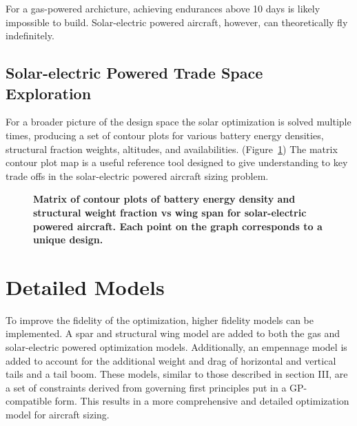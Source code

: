 \documentclass[]{aiaa-tc}%
\begin{document}
For a gas-powered archicture, achieving endurances above 10 days is likely impossible to build.  Solar-electric powered aircraft, however, can theoretically fly indefinitely. 

\subsection{Solar-electric Powered Trade Space Exploration}

For a broader picture of the design space the solar optimization is solved multiple times, producing a set of contour plots for various battery energy densities, structural fraction weights, altitudes, and availabilities.  (Figure~\ref{f:solarcontours}) 
The matrix contour plot map is a useful reference tool designed to give understanding to key trade offs in the solar-electric powered aircraft sizing problem.

 \begin{figure}[H]
 \begin{subfigmatrix}{3}%
 \end{subfigmatrix}
 \caption{ \textbf{Matrix of contour plots of battery energy density and structural weight fraction vs wing span for solar-electric powered aircraft. Each point on the graph corresponds to a unique design.} }
 \label{f:solarcontours}
\end{figure}

\section{Detailed Models}

To improve the fidelity of the optimization, higher fidelity models can be implemented.  
A spar and structural wing model are added to both the gas and solar-electric powered optimization models.  
Additionally, an empennage model is added to account for the additional weight and drag of horizontal and vertical tails and a tail boom.  
These models, similar to those described in section III, are a set of constraints derived from governing first principles put in a GP-compatible form. 
This results in a more comprehensive and detailed optimization model for aircraft sizing.   \\
\end{document}
